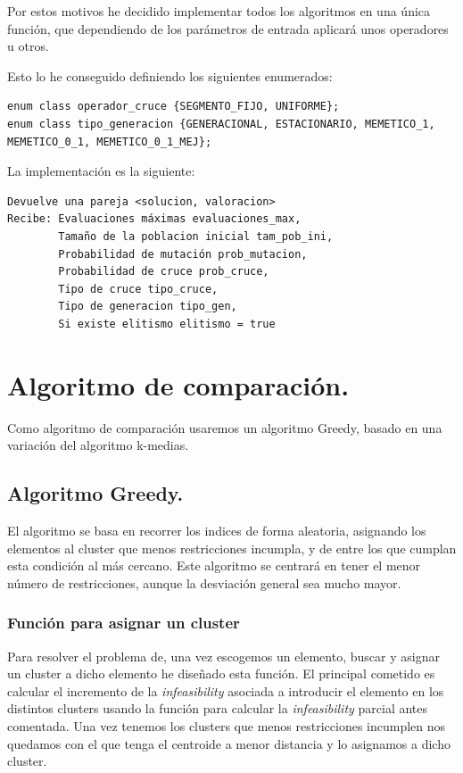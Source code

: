 \documentclass[12pt, spanish]{article}
\begin{document}
Por estos motivos he decidido implementar todos los algoritmos en una única función, que dependiendo de los parámetros de entrada aplicará unos operadores u otros.

Esto lo he conseguido definiendo los siguientes enumerados:

\begin{lstlisting}
enum class operador_cruce {SEGMENTO_FIJO, UNIFORME};
enum class tipo_generacion {GENERACIONAL, ESTACIONARIO, MEMETICO_1, MEMETICO_0_1, MEMETICO_0_1_MEJ};
\end{lstlisting}

La implementación es la siguiente:

\begin{lstlisting}
Devuelve una pareja <solucion, valoracion>
Recibe: Evaluaciones máximas evaluaciones_max, 
		Tamaño de la poblacion inicial tam_pob_ini,
		Probabilidad de mutación prob_mutacion,
		Probabilidad de cruce prob_cruce, 
		Tipo de cruce tipo_cruce,
		Tipo de generacion tipo_gen,
		Si existe elitismo elitismo = true
\end{lstlisting}

\section{Algoritmo de comparación.}

Como algoritmo de comparación usaremos un algoritmo Greedy, basado en una variación del algoritmo k-medias.

\subsection{Algoritmo Greedy.}

El algoritmo se basa en recorrer los indices de forma aleatoria, asignando los elementos al cluster que menos restricciones incumpla, y de entre los que cumplan esta condición al más cercano. Este algoritmo se centrará en tener el menor número de restricciones, aunque la desviación general sea mucho mayor.

\subsubsection{Función para asignar un cluster}

Para resolver el problema de, una vez escogemos un elemento, buscar y asignar un cluster a dicho elemento he diseñado esta función. El principal cometido es calcular el incremento de la \textit{infeasibility} asociada a introducir el elemento en los distintos clusters usando la función para calcular la \textit{infeasibility} parcial antes comentada. Una vez tenemos los clusters que menos restricciones incumplen nos quedamos con el que tenga el centroide a menor distancia y lo asignamos a dicho cluster.
\end{document}
